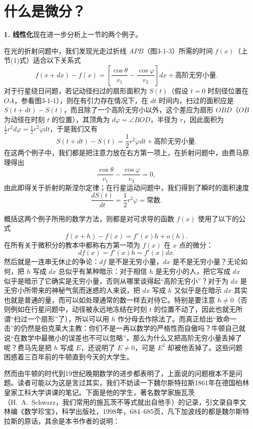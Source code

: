 \section{什么是微分？}

\noindent\textbf{1. 线性化}\quad 现在进一步分析上一节的两个例子。

在光的折射问题中，我们发现光走过折线 $APB$（图3-1-3）所需的时间 $f(x)$（上节(1)式）适合以下关系式
\[
 f(x+dx)-f(x)=\left[\frac{\cos\theta}{v_1}-\frac{\cos\varphi}{v_2}\right]dx+\text{高阶无穷小量}.
\]
对于行星绕日问题，若记动径扫过的扇形面积为 $S(t)$（假设 $t=0$ 时刻径位置在 $OA$，参看图3-1-1），则在有引力存在情况下，在 $dt$ 时间内，扫过的面积应是 $S(t+dt)-S(t)$，而且除了一个高阶无穷小以外，这个差应为扇形 $OBD$（$OB$ 为动径在时刻 $t$ 的位置），其顶角为 $d\varphi=\angle BOD$，半径为 $r$，因此面积为 $\frac12r^2d\varphi=\frac12r^2\dot\varphi dt$，于是我们又有
\[
 S(t+dt)-S(t)=\frac12r^2\dot\varphi dt+\text{高阶无穷小量}.
\]
在这两个例子中，我们都是把注意力放在右方第一项上，在折射问题中，由费马原理得出
\[
 \frac{\cos\theta}{v_1}-\frac{\cos\varphi}{v_2}=0,
\]
由此即得关于折射的斯涅尔定律；在行星运动问题中，我们得到了瞬时的面积速度
\[
 \frac{dS(t)}{dt}=\frac12r^2\dot\varphi=\text{常数}.
\]

概括这两个例子所用的数学方法，则都是对可求导的函数 $f(x)$ 使用了以下的公式
\begin{equation}
 f(x+h)-f(x)=f'(x)h+o(h).
 \tag{1}
\end{equation}
在所有关于微积分的教本中都称右方第一项为 $f(x)$ 在 $x$ 点的微分：
\begin{equation}
 df(x)=f'(x)h=f'(x)dx.
 \tag{2}
\end{equation}
然后就是一连串无休止的争论：$df$ 是不是无穷小量，$dx$ 是不是无穷小量？无论如何，把 $h$ 写成 $dx$ 总似乎有某种暗示：对于相信 $h$ 是无穷小的人，把它写成 $dx$ 似乎是暗示了它确实是无穷小量，否则从哪里谈得起“高阶无穷小”？对于为 $dx$ 是无穷小所带来的神秘气氛而迷惑的人来说，把 $dx$ 写成 $h$ 又似乎是在暗示 $dx$ 其实也就是普通的量，而可以如处理通常的数一样去对待它。特别是要注意 $h\ne0$（否则例如在行星问题中，动径被永远地冻结在时刻 $t$ 的位置不动了，因此也就无所谓“扫过一个扇形”了），所以可以用 $h$ 作分母去作除法了。而真正给出“致命一击”的仍然是伯克莱大主教：你们不是一再以数学的严格性而自傲吗？牛顿自己就说“在数学中最微小的误差也不可以忽略”，那么为什么又把高阶无穷小量丢掉了呢？费马先是把 $h$ 写成 $E$，还说明了 $E\ne0$，可是 $E^2$ 却被他丢掉了。这些问题困惑着三百年前的牛顿直到今天的大学生。

然而由牛顿的时代到19世纪晚期数学的进步都表明了，上面说的问题根本不是问题。读者可能以为这是言过其实，我们不妨读一下魏尔斯特拉斯1861年在德国柏林皇家工科大学讲课的笔记。下面是他的学生，著名数学家施瓦茨（H.~A.~Schwarz，我们常用的施瓦茨不等式就出自他手）的记录，引文录自李文林编《数学珍宝》，科学出版社，1998年，684--685页，凡下加波线的都是魏尔斯特拉斯的原话，其余是本书作者的说明：

